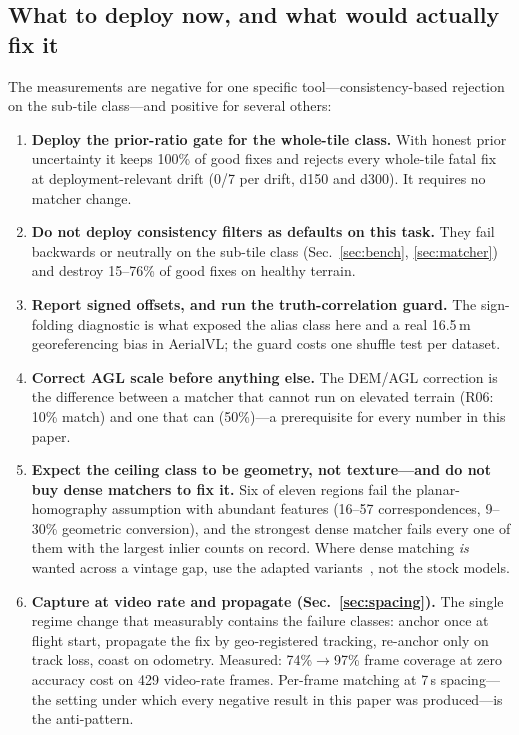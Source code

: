\documentclass[journal]{IEEEtran}
\begin{document}
\subsection{What to deploy now, and what would actually fix it}
The measurements are negative for one specific tool---consistency-based rejection on the sub-tile class---and positive for several others:
\begin{enumerate}
\item \textbf{Deploy the prior-ratio gate for the whole-tile class.} With honest prior uncertainty it keeps 100\% of good fixes and rejects every whole-tile fatal fix at deployment-relevant drift (0/7 per drift, d150 and d300). It requires no matcher change.
\item \textbf{Do not deploy consistency filters as defaults on this task.} They fail backwards or neutrally on the sub-tile class (Sec.~\ref{sec:bench}, \ref{sec:matcher}) and destroy 15--76\% of good fixes on healthy terrain.
\item \textbf{Report signed offsets, and run the truth-correlation guard.} The sign-folding diagnostic is what exposed the alias class here and a real 16.5\,m georeferencing bias in AerialVL; the guard costs one shuffle test per dataset.
\item \textbf{Correct AGL scale before anything else.} The DEM/AGL correction is the difference between a matcher that cannot run on elevated terrain (R06: 10\% match) and one that can (50\%)---a prerequisite for every number in this paper.
\item \textbf{Expect the ceiling class to be geometry, not texture---and do not buy dense matchers to fix it.} Six of eleven regions fail the planar-homography assumption with abundant features (16--57 correspondences, 9--30\% geometric conversion), and the strongest dense matcher fails every one of them with the largest inlier counts on record. Where dense matching \emph{is} wanted across a vintage gap, use the adapted variants~\cite{satroma,loretta}, not the stock models.
\item \textbf{Capture at video rate and propagate (Sec.~\ref{sec:spacing}).} The single regime change that measurably contains the failure classes: anchor once at flight start, propagate the fix by geo-registered tracking, re-anchor only on track loss, coast on odometry. Measured: 74\%$\to$97\% frame coverage at zero accuracy cost on 429 video-rate frames. Per-frame matching at 7\,s spacing---the setting under which every negative result in this paper was produced---is the anti-pattern.
\end{enumerate}
\end{document}
